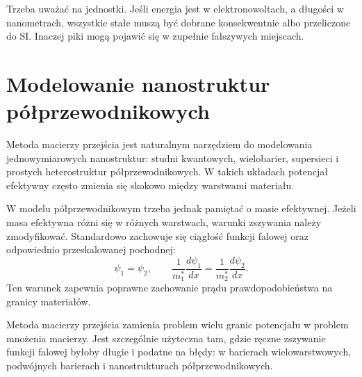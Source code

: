 Trzeba uważać na jednostki. Jeśli energia jest w elektronowoltach, a długości w nanometrach, wszystkie stałe muszą być dobrane konsekwentnie albo przeliczone do SI. Inaczej piki mogą pojawić się w zupełnie fałszywych miejscach.

\section{Modelowanie nanostruktur półprzewodnikowych}

Metoda macierzy przejścia jest naturalnym narzędziem do modelowania jednowymiarowych nanostruktur: studni kwantowych, wielobarier, supersieci i prostych heterostruktur półprzewodnikowych. W takich układach potencjał efektywny często zmienia się skokowo między warstwami materiału.

W modelu półprzewodnikowym trzeba jednak pamiętać o masie efektywnej. Jeżeli masa efektywna różni się w różnych warstwach, warunki zszywania należy zmodyfikować. Standardowo zachowuje się ciągłość funkcji falowej oraz odpowiednio przeskalowanej pochodnej:
\begin{equation}
    \psi_1=\psi_2,
    \qquad
    \frac{1}{m_1^*}\frac{d\psi_1}{dx}
    =
    \frac{1}{m_2^*}\frac{d\psi_2}{dx}.
\end{equation}
Ten warunek zapewnia poprawne zachowanie prądu prawdopodobieństwa na granicy materiałów.

\begin{summarybox}
Metoda macierzy przejścia zamienia problem wielu granic potencjału w problem mnożenia macierzy. Jest szczególnie użyteczna tam, gdzie ręczne zszywanie funkcji falowej byłoby długie i podatne na błędy: w barierach wielowarstwowych, podwójnych barierach i nanostrukturach półprzewodnikowych.
\end{summarybox}
